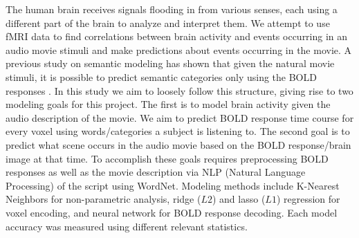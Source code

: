 \par The human brain receives signals flooding in from various senses, each using a different part of the brain to analyze and interpret them. We attempt to use fMRI data to find correlations between brain activity and events occurring in an audio movie stimuli and make predictions about events occurring in the movie. A previous study on semantic modeling has shown that given the natural movie stimuli, it is possible to predict semantic categories only using the BOLD responses \cite{stansbury2013neuron}. In this study we aim to loosely follow this structure, giving rise to two modeling goals for this project. The first is to model brain activity given the audio description of the movie. We aim to predict BOLD response time course for every voxel using words/categories a subject is listening to. The second goal is to predict what scene occurs in the audio movie based on the BOLD response/brain image at that time. To accomplish these goals requires preprocessing BOLD responses as well as the movie description via NLP (Natural Language Processing) of the script using WordNet. Modeling methods include K-Nearest Neighbors for non-parametric analysis, ridge ($L2$) and lasso ($L1$) regression for voxel encoding, and neural network for BOLD response decoding. Each model accuracy was measured using different relevant statistics.

